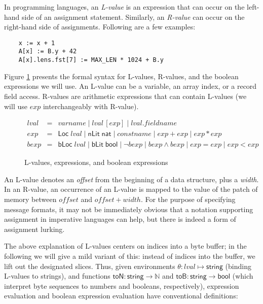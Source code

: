 \documentclass[a4paper,UKenglish,cleveref, autoref, thm-restate]{lipics-v2021}
\newcommand{\konst}[1]{\ensuremath{\mathsf{#1}}}
\begin{document}
In programming languages, an \emph{L-value} is an expression that can
occur on the left-hand side of an assignment statement. Similarly, an
\emph{R-value} can occur on the right-hand side of
assignments. Following are a few examples:
{\small
\begin{verbatim}
    x := x + 1
    A[x] := B.y + 42
    A[x].lens.fst[7] := MAX_LEN * 1024 + B.y
\end{verbatim}
}
Figure \ref{Lvalues} presents the formal syntax for L-values, R-values,
and the boolean expressions we will use.  An L-value can be
a variable, an array index, or a record field access. R-values are
arithmetic expressions that can contain L-values (we will use
$\mathit{exp}$ interchangeably with R-value).

\begin{figure}
\[
\begin{array}{rcl}
\mathit{lval} & = & \mathit{varname} \mid
                    \mathit{lval} \, [ \mathit{exp} ] \mid
                    \mathit{lval} . \mathit{fieldname} \\
\mathit{exp} & = & \konst{Loc}\; \mathit{lval}
              \mid \konst{nLit}\; \konst{nat}
              \mid \mathit{constname}
              \mid \mathit{exp} + \mathit{exp}
              \mid \mathit{exp} * \mathit{exp} \\
\mathit{bexp} & = & \konst{bLoc}\; \mathit{lval}
              \mid  \konst{bLit}\; \konst{bool}
              \mid  \neg \mathit{bexp}
              \mid  \mathit{bexp} \land \mathit{bexp}
              \mid  \mathit{exp} = \mathit{exp}
              \mid  \mathit{exp} < \mathit{exp}
\end{array}
\]
\caption{L-values, expressions, and boolean expressions}
\label{Lvalues}
\end{figure}

An L-value denotes an \emph{offset} from the beginning of a
data structure, plus a \emph{width}. In an R-value, an occurrence of an
L-value is mapped to the value of the patch of memory between
$\mathit{offset}$ and $\mathit{offset} + \mathit{width}$. For the
purpose of specifying message formats, it may not be immediately
obvious that a notation supporting assignment in imperative languages
can help, but there is indeed a form of assignment lurking.

The above explanation of L-values centers on indices into a byte
buffer; in the following we will give a mild variant of this: instead
of indices into the buffer, we lift out the designated slices. Thus,
given environments $\theta: \mathit{lval} \mapsto \konst{string}$ (binding
L-values to strings), and functions
$\konst{toN}:\konst{string}\to\mathbb{N}$ and
$\konst{toB}:\konst{string}\to\konst{bool}$ (which interpret byte
sequences to numbers and booleans, respectively), expression
evaluation and boolean expression evaluation have conventional
definitions:
\end{document}
